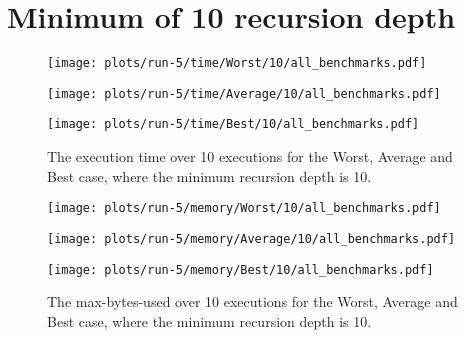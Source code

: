 \section{Minimum of 10 recursion depth}
\label{app-sec-10-rec-depth}
\begin{figure}[H]
  \begin{minipage}{.5\textwidth}
    \centering
    \texttt{[image: plots/run-5/time/Worst/10/all\_benchmarks.pdf]}  
  \end{minipage}
  \begin{minipage}{.5\textwidth}
    \centering
    \texttt{[image: plots/run-5/time/Average/10/all\_benchmarks.pdf]}  
  \end{minipage}
  \begin{center}
    \begin{minipage}[c]{.5\textwidth}
      \centering
      \texttt{[image: plots/run-5/time/Best/10/all\_benchmarks.pdf]}  
    \end{minipage}
  \end{center}
  \caption{The execution time over 10 executions for the Worst, Average and Best case, where the minimum recursion depth is 10.}
\end{figure}
\begin{figure}[H]
  \begin{minipage}{.5\textwidth}
    \centering
    \texttt{[image: plots/run-5/memory/Worst/10/all\_benchmarks.pdf]}  
  \end{minipage}
  \begin{minipage}{.5\textwidth}
    \centering
    \texttt{[image: plots/run-5/memory/Average/10/all\_benchmarks.pdf]}  
  \end{minipage}
  \begin{center}
    \begin{minipage}[c]{.5\textwidth}
      \centering
      \texttt{[image: plots/run-5/memory/Best/10/all\_benchmarks.pdf]}  
    \end{minipage}
  \end{center}
  \caption{The max-bytes-used over 10 executions for the Worst, Average and Best case, where the minimum recursion depth is 10.}
\end{figure}


\newcommand{\individualbenchmark}[2]{
  \begin{minipage}{.5\textwidth}
    \centering
    \texttt{[image: \#1]}
    \caption{#2}
  \end{minipage}
}

